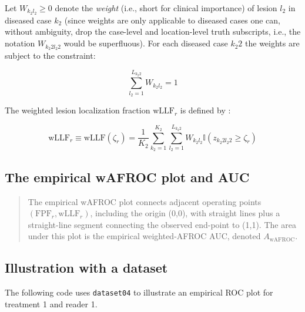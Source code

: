 \documentclass[
]{book}
\newenvironment{Shaded}{\begin{snugshade}}{\end{snugshade}}
\newcommand{\AttributeTok}[1]{\textcolor[rgb]{0.77,0.63,0.00}{#1}}
\newcommand{\DecValTok}[1]{\textcolor[rgb]{0.00,0.00,0.81}{#1}}
\newcommand{\FunctionTok}[1]{\textcolor[rgb]{0.00,0.00,0.00}{#1}}
\newcommand{\NormalTok}[1]{#1}
\newcommand{\OtherTok}[1]{\textcolor[rgb]{0.56,0.35,0.01}{#1}}
\newcommand{\SpecialCharTok}[1]{\textcolor[rgb]{0.00,0.00,0.00}{#1}}
\newcommand{\StringTok}[1]{\textcolor[rgb]{0.31,0.60,0.02}{#1}}
\begin{document}
Let \(W_{k_2 l_2} \geq 0\) denote the \emph{weight} (i.e., short for clinical importance) of lesion \(l_2\) in diseased case \(k_2\) (since weights are only applicable to diseased cases one can, without ambiguity, drop the case-level and location-level truth subscripts, i.e., the notation \(W_{k_2 2 l_2 2}\) would be superfluous). For each diseased case \(k_2 2\) the weights are subject to the constraint:

\begin{equation}
\sum_{l_2 =1 }^{L_{k_2 2}} W_{k_2 l_2} = 1
\label{eq:empirical-weights-constraint}
\end{equation}

The weighted lesion localization fraction \(\text{wLLF}_r\) is defined by \citep{RN2484}:

\begin{equation}
\text{wLLF}_r \equiv \text{wLLF}\left ( \zeta_r \right ) = \frac{1}{K_2}\sum_{k_2=1}^{K_2}\sum_{l_2=1}^{L_{k_2 2}}W_{k_2 l_2} \mathbb{I}\left ( z_{k_2 2 l_2 2} \geq \zeta_r \right )
\label{eq:empirical-wLLFr}
\end{equation}

\hypertarget{empirical-definition-empirical-auc-wafroc}{%
\subsection{The empirical wAFROC plot and AUC}\label{empirical-definition-empirical-auc-wafroc}}

\begin{quote}
The empirical wAFROC plot connects adjacent operating points \(\left ( \text{FPF}_r, \text{wLLF}_r \right )\), including the origin (0,0), with straight lines plus a straight-line segment connecting the observed end-point to (1,1). The area under this plot is the empirical weighted-AFROC AUC, denoted \(A_{\text{wAFROC}}\).
\end{quote}

\hypertarget{empirical-wafroc-plot-illustration}{%
\subsection{Illustration with a dataset}\label{empirical-wafroc-plot-illustration}}

The following code uses \texttt{dataset04} to illustrate an empirical ROC plot for treatment 1 and reader 1.

\begin{Shaded}
\end{Shaded}
\end{document}

